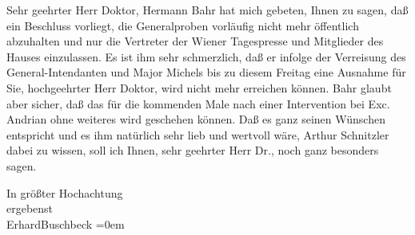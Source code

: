 \pstart{}Sehr geehrter Herr Doktor,\pend\vspace{0.5em}
\pstart
           Hermann Bahr hat mich gebeten, Ihnen zu sagen,
               daß ein Beschluss vorliegt, die Generalproben vorläufig nicht mehr öffentlich
               abzuhalten und nur die Vertreter der Wiener
               Tagespresse und Mitglieder des Hauses einzulassen. Es ist ihm sehr schmerzlich, daß
               er infolge der Verreisung des General-Intendanten und Major Michels bis zu diesem Freitag eine Ausnahme für Sie,
               hochgeehrter Herr Doktor, wird nicht mehr erreichen können. Bahr glaubt aber sicher, daß das für die kommenden Male nach
               einer Intervention bei Exc. Andrian ohne
               weiteres wird geschehen können. Daß es ganz seinen Wünschen entspricht und es ihm
               natürlich sehr lieb \introOben{}und wertvoll\introOben{} wäre, Arthur Schnitzler
               dabei zu wissen, soll ich Ihnen, sehr geehrter Herr Dr., noch ganz besonders
               sagen.\pend
           
\pstart
           In größter Hochachtung{\\[\baselineskip]}ergebenst{\\[\baselineskip]}\spacefill\mbox{ErhardBuschbeck}\pend
           \leftskip=0em{}\endnumbering{}  \newcommand{\dateiname}{L02305}\newcommand{\titel}{Erhard Buschbeck an Arthur Schnitzler, 24. 9. 1918}\newcommand{\editorInnen}{Herausgegeben von Martin Anton Müller}
